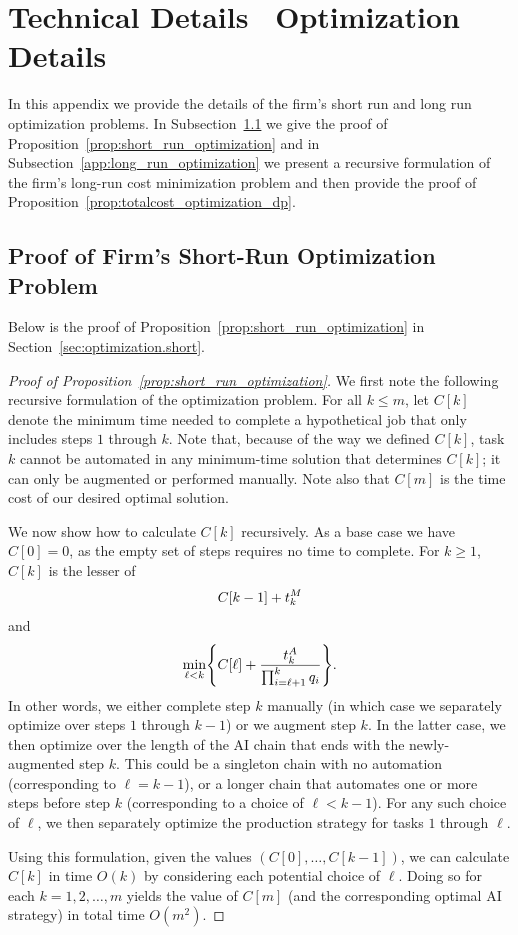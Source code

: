 \section{Technical Details \textendash \ Optimization Details}
\label{app:optimization_details}

\renewcommand{\theproposition}{C.\arabic{proposition}}
\setcounter{proposition}{0}

In this appendix we provide the details of the firm's short run and long run optimization problems. 
In Subsection~\ref{app:short_run_optimization} we give the proof of Proposition~\ref{prop:short_run_optimization} and in Subsection~\ref{app:long_run_optimization} we present a recursive formulation of the firm's long-run cost minimization problem and then provide the proof of Proposition~\ref{prop:totalcost_optimization_dp}.

\subsection{Proof of Firm's Short-Run Optimization Problem}
\label{app:short_run_optimization}
Below is the proof of Proposition~\ref{prop:short_run_optimization} in Section~\ref{sec:optimization.short}.

\begin{proof}[Proof of Proposition~\ref{prop:short_run_optimization}]
    We first note the following recursive formulation of the optimization problem. 
    For all $k \leq m$, let $C[k]$ denote the minimum time needed to complete a hypothetical job that only includes steps $1$ through $k$.  
    Note that, because of the way we defined $C[k]$, task $k$ cannot be automated in any minimum-time solution that determines $C[k]$; it can only be augmented or performed manually.  
    Note also that $C[m]$ is the time cost of our desired optimal solution.
    
    We now show how to calculate $C[k]$ recursively.  
    As a base case we have $C[0] = 0$, as the empty set of steps requires no time to complete.  
    For $k \geq 1$, $C[k]$ is the lesser of
    \[ C[k-1] + t^{M}_{k} \]
    and
    \[ \min_{\ell < k} \Biggl\{ C[\ell] + \frac{t^{A}_{k}}{\prod_{i=\ell+1}^k q_i} \Biggr\}.
    \]
    In other words, we either complete step $k$ manually (in which case we separately optimize over steps $1$ through $k-1$) or we augment step $k$.  
    In the latter case, we then optimize over the length of the AI chain that ends with the newly-augmented step $k$.  
    This could be a singleton chain with no automation (corresponding to $\ell = k-1$), or a longer chain that automates one or more steps before step $k$ (corresponding to a choice of $\ell < k-1$).  
    For any such choice of $\ell$, we then separately optimize the production strategy for tasks $1$ through $\ell$.
    
    Using this formulation, given the values $(C[0], \dotsc, C[k-1])$, we can calculate $C[k]$ in time $O(k)$ by considering each potential choice of $\ell$.  
    Doing so for each $k = 1, 2, \dotsc, m$ yields the value of $C[m]$ (and the corresponding optimal AI strategy) in total time $O(m^2)$.
\end{proof}



